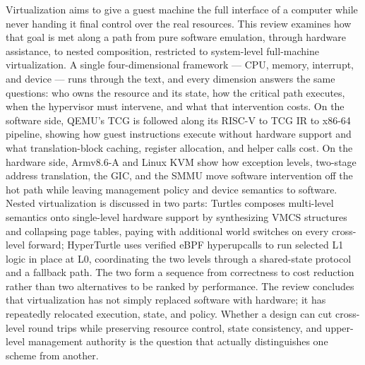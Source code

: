 Virtualization aims to give a guest machine the full interface of a computer while never handing it final control over the real resources. This review examines how that goal is met along a path from pure software emulation, through hardware assistance, to nested composition, restricted to system-level full-machine virtualization. A single four-dimensional framework --- CPU, memory, interrupt, and device --- runs through the text, and every dimension answers the same questions: who owns the resource and its state, how the critical path executes, when the hypervisor must intervene, and what that intervention costs. On the software side, QEMU's TCG is followed along its RISC-V to TCG IR to x86-64 pipeline, showing how guest instructions execute without hardware support and what translation-block caching, register allocation, and helper calls cost. On the hardware side, Armv8.6-A and Linux KVM show how exception levels, two-stage address translation, the GIC, and the SMMU move software intervention off the hot path while leaving management policy and device semantics to software. Nested virtualization is discussed in two parts: Turtles composes multi-level semantics onto single-level hardware support by synthesizing VMCS structures and collapsing page tables, paying with additional world switches on every cross-level forward; HyperTurtle uses verified eBPF hyperupcalls to run selected L1 logic in place at L0, coordinating the two levels through a shared-state protocol and a fallback path. The two form a sequence from correctness to cost reduction rather than two alternatives to be ranked by performance. The review concludes that virtualization has not simply replaced software with hardware; it has repeatedly relocated execution, state, and policy. Whether a design can cut cross-level round trips while preserving resource control, state consistency, and upper-level management authority is the question that actually distinguishes one scheme from another.


\pagestyle{enfrontmatterstyle}
\cleardoublepage\pagestyle{frontmatterstyle}
